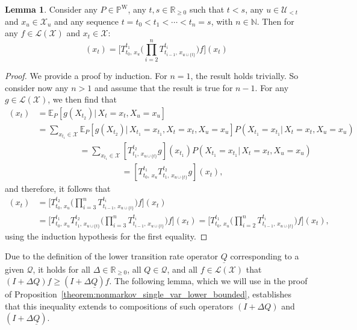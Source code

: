 \documentclass[10pt,a4paper]{paper}
\theoremstyle{definition}
\newtheorem{lemma}[theorem]{Lemma}
\newcommand{\nats}{\mathbb{N}}
\newcommand{\reals}{\mathbb{R}}
\newcommand{\realsnonneg}{\reals_{\geq 0}}
\newcommand{\states}{\mathcal{X}}
\newcommand{\processes}{\mathbb{P}}
\newcommand{\wprocesses}{\processes^{\mathrm{W}}}
\newcommand{\gambles}{\mathcal{L}}
\newcommand{\gamblesX}{\gambles(\states)}
\newcommand{\rateset}{\mathcal{Q}}
\newcommand{\lrate}{\underline{Q}}
\begin{document}
\begin{lemma}\label{lemma:weirddecomposition}
Consider any $P\in\wprocesses$, any $t,s\in\realsnonneg$ such that $t<s$, any $u\in\mathcal{U}_{<t}$ and $x_u\in\states_u$ and any sequence $t=t_0<t_1<\cdots<t_n=s$, with $n\in\nats$.
Then for any $f\in\gamblesX$ and $x_t\in\states$:
\begin{equation*}
[T_{t,\,x_u}^sf](x_t)
=\Big[T_{t_0,\,x_u}^{t_1}\Bigg(\prod_{i=2}^{n}T_{t_{i-1},\,x_{u\cup\{t\}}}^{t_{i}}\Bigg)f\Big](x_t)
\end{equation*}
\end{lemma}
\begin{proof}
We provide a proof by induction. For $n=1$, the result holds trivially. So consider now any $n>1$ and assume that the result is true for $n-1$.
For any $g\in\gamblesX$, we then find that
\begin{align*}
[T_{t_0,\,x_u}^{t_2}g](x_t)
&=\mathbb{E}_P[g(X_{t_2})\vert\,X_{t}=x_t,X_u=x_u]\\
&=\sum_{x_{t_1}\in\states}\mathbb{E}_P[g(X_{t_2})\vert\,X_{t_1}=x_{t_1},X_{t}=x_t,X_u=x_u]P(X_{t_1}=x_{t_1}\vert\,X_{t}=x_t,X_u=x_u)\\[-8pt]
&\quad\quad\quad\quad\quad=\sum_{x_{t_1}\in\states}
[T_{t_1,\,x_{u\cup\{t\}}}^{t_{2}}g](x_{t_1})P(X_{t_1}=x_{t_1}\vert\,X_{t}=x_t,X_u=x_u)\\[-6pt]
&\quad\quad\quad\quad\quad\quad\quad\quad\quad\quad=[T_{t_0,\,x_u}^{t_1}
T_{t_1,\,x_{u\cup\{t\}}}^{t_{2}}g](x_t),
\end{align*}
and therefore, it follows that
\begin{align*}
[T_{t,\,x_u}^sf](x_t)
&=\Big[T_{t_0,\,x_u}^{t_2}\Bigg(\prod_{i=3}^{n}T_{t_{i-1},\,x_{u\cup\{t\}}}^{t_{i}}\Bigg)f\Big](x_t)
\\
 &= \Big[T_{t_0,\,x_u}^{t_1}
T_{t_1,\,x_{u\cup\{t\}}}^{t_{2}}
\Bigg(\prod_{i=3}^{n}T_{t_{i-1},\,x_{u\cup\{t\}}}^{t_{i}}\Bigg)f\Big](x_t) =\Big[T_{t_0,\,x_u}^{t_1}\Bigg(\prod_{i=2}^{n}T_{t_{i-1},\,x_{u\cup\{t\}}}^{t_{i}}\Bigg)f\Big](x_t),
\end{align*}
using the induction hypothesis for the first equality.
\end{proof}

Due to the definition of the lower transition rate operator $\lrate$ corresponding to a given $\rateset$, it holds for all $\Delta\in\realsnonneg$, all $Q\in\rateset$, and all $f\in\gamblesX$ that $(I+\Delta Q)f \geq (I+\Delta\lrate)f$. The following lemma, which we will use in the proof of Proposition~\ref{theorem:nonmarkov_single_var_lower_bounded}, establishes that this inequality extends to compositions of such operators $(I+\Delta Q)$ and $(I+\Delta\lrate)$.
\end{document}
